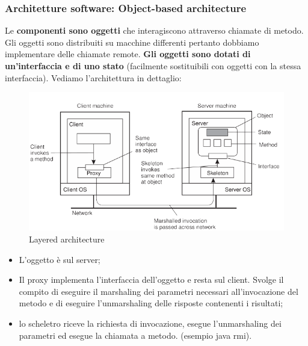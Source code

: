 \documentclass[12pt]{article}
\begin{document}
 	\subsubsection{Architetture software: Object-based architecture }
 		Le \textbf{componenti sono oggetti} che interagiscono attraverso chiamate di metodo. Gli oggetti sono distribuiti su macchine differenti pertanto dobbiamo implementare delle chiamate remote. \textbf{Gli oggetti sono dotati di un'interfaccia e di uno stato} (facilmente sostituibili con oggetti con la stessa interfaccia). Vediamo l'architettura in dettaglio:
 		\begin{figure}[h!]
 			\centering
 			\includegraphics[scale=0.40]{img/oba.png}
 			\caption{Layered architecture}
 		\end{figure}
 		\begin{itemize}
 			\item L'oggetto è sul server;
 			\item Il proxy implementa l'interfaccia dell'oggetto e resta sul client. Svolge il compito di eseguire il marshaling dei parametri necessari all'invocazione del metodo e di eseguire l'unmarshaling delle risposte contenenti i risultati;
 			\item lo scheletro riceve la richiesta di invocazione, esegue l'unmarshaling dei parametri ed esegue la chiamata a metodo. (esempio java rmi).
 		\end{itemize}
\end{document}
